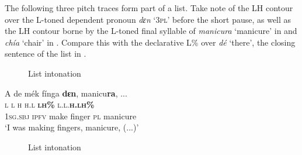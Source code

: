 The following three pitch traces form part of a list. Take note of the LH contour over the L-toned dependent pronoun \textit{dɛn} ‘\textsc{3pl}’ before the short pause, as well as the LH contour borne by the L-toned final syllable of \textit{manicura} ‘manicure’ in  and \textit{chía} ‘chair’ in . Compare this with the declarative L\% over \textit{dé} ‘there’, the closing sentence of the list in .


\begin{figure}[b]
\caption{List intonation}
\label{fig:key:3.36}
\end{figure}


\ea%
    \label{ex:key:89}
    \glll   A    de  mék    fínga  \textbf{dɛn},    manicu\textbf{ra},  \op...\cp\\
\textsc{l}    \textsc{l}  \textsc{h}    \textsc{h.l}    \textbf{\textsc{lh\%}}    \textsc{l.l.}\textbf{\textsc{h.lh\%}}\\
\textsc{1sg.sbj}  \textsc{ipfv}  make  finger  \textsc{pl}    manicure\\
\glt ‘I was making fingers, manicure, (...)’
\z

\begin{figure}
\caption{List intonation}
\label{fig:key:3.37}
\end{figure}


